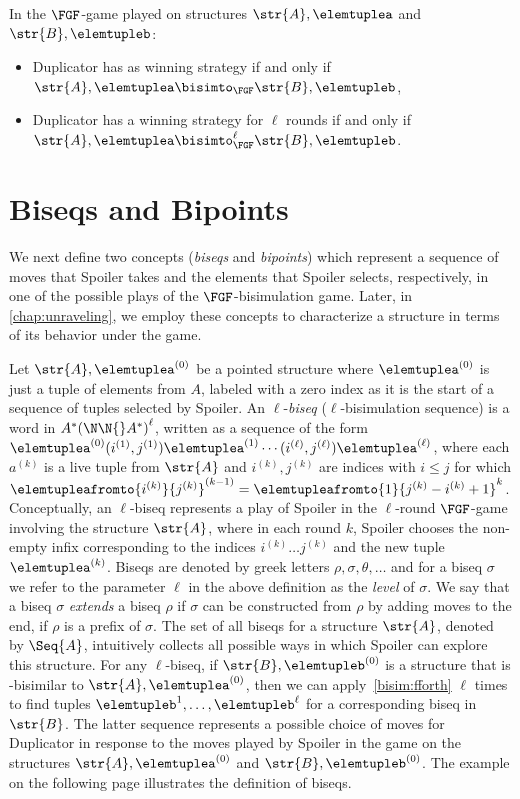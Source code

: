 \begin{corollary}
  In the $\FGF$-game played on structures $\str{A}, \elemtuplea$ and $\str{B}, \elemtupleb$:
  \begin{itemize}
    \item Duplicator has as winning strategy if and only if $\str{A}, \elemtuplea \bisimto_{\FGF} \str{B}, \elemtupleb$,
    \item Duplicator has a winning strategy for $\ell$ rounds if and only if $\str{A}, \elemtuplea \bisimto_{\FGF}^{\ell} \str{B}, \elemtupleb$.
  \end{itemize}
\end{corollary}

\section{Biseqs and Bipoints}\label{sec:biseqs-and-bipoints}
We next define two concepts (\emph{biseqs} and \emph{bipoints}) which represent a sequence of moves that Spoiler takes and the elements that Spoiler selects, respectively, in one of the possible plays of the $\FGF$-bisimulation game.
Later, in \cref{chap:unraveling}, we employ these concepts to characterize a structure in terms of its behavior under the game.

Let $\str{A}, \elemtuplea^{(0)}$ be a pointed structure where $\elemtuplea^{(0)}$ is just a tuple of elements from $A$, labeled with a zero index as it is the start of a sequence of tuples selected by Spoiler.
An $\ell$-\emph{biseq} ($\ell$-bisimulation sequence) is a word in $A^*{(\N\N{}A^{*})}^{\ell}$, written as a sequence of the form $\elemtuplea^{(0)}(i^{(1)}, j^{(1)})\elemtuplea^{(1)}\cdots(i^{(\ell)}, j^{(\ell)})\elemtuplea^{(\ell)}$, where each $a^{(k)}$ is a live tuple from $\str{A}$ and $i^{(k)}, j^{(k)}$ are indices with $i \le j$ for which $\elemtupleafromto{i^{(k)}}{j^{(k)}}^{(k-1)} = \elemtupleafromto{1}{j^{(k)}-i^{(k)}+1}^{k}$.
Conceptually, an $\ell$-biseq represents a play of Spoiler in the $\ell$-round $\FGF$-game involving the structure $\str{A}$, where in each round $k$, Spoiler chooses the non-empty infix corresponding to the indices $i^{(k)}\ldots{}j^{(k)}$ and the new tuple $\elemtuplea^{(k)}$.
Biseqs are denoted by greek letters $\rho, \sigma, \theta, \ldots$ and for
a biseq $\sigma$ we refer to the parameter $\ell$ in the above definition as the \emph{level} of $\sigma$.
We say that a biseq $\sigma$ \emph{extends} a biseq $\rho$ if $\sigma$ can be constructed from $\rho$ by adding moves to the end, \ie{} if $\rho$ is a prefix of $\sigma$.
The set of all biseqs for a structure $\str{A}$, denoted by $\Seq{A}$, intuitively collects all possible ways in which Spoiler can explore this structure.
For any $\ell$-biseq, if $\str{B}, \elemtupleb^{(0)}$ is a structure that is \FGF-bisimilar to $\str{A}, \elemtuplea^{(0)}$, then we can apply~\ref{bisim:fforth} $\ell$ times to find tuples $\elemtupleb^{1}, \ldots, \elemtupleb^{\ell}$ for a corresponding biseq in $\str{B}$.
The latter sequence represents a possible choice of moves for Duplicator in response to the moves played by Spoiler in the game on the structures $\str{A}, \elemtuplea^{(0)}$ and $\str{B}, \elemtupleb^{(0)}$. The example on the following page illustrates the definition of biseqs.\clearpage

